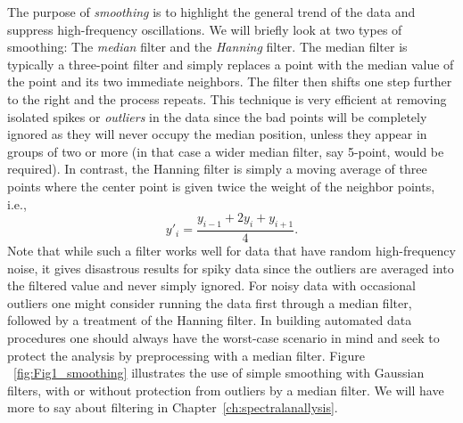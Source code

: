 	The purpose of \emph{smoothing} is to highlight the general trend of the data and suppress
high-frequency oscillations.  We will briefly look at two types of smoothing: The \emph{median} filter and the \emph{Hanning} 
filter. The median filter is typically a three-point filter and simply replaces a point 
with the median value of the point and its two immediate neighbors.  The filter then shifts one step 
further to the right and the process repeats.  This technique is very efficient at removing isolated 
spikes or \emph{outliers} in the data since the bad points will be completely ignored as they will never 
occupy the median position, unless they appear in groups of two or more (in that case a wider 
median filter, say 5-point, would be required).  In contrast, the Hanning filter is simply a moving average of 
three points where the center point is given twice the weight of the neighbor points, i.e.,
\begin{equation}	 
y'_i = \frac{y_{i-1} + 2y_i + y_{i + 1}}{4}.
\end{equation}
Note that while such a filter works well for data that have random high-frequency noise, it gives 
disastrous results for spiky data since the outliers are averaged into the filtered value and never 
simply ignored.  For noisy data with occasional outliers one might consider running the data first 
through a median filter, followed by a treatment of the Hanning filter.  In building automated data
procedures one should always have the worst-case scenario in mind and seek to protect the analysis by
preprocessing with a median filter.  Figure ~\ref{fig:Fig1_smoothing} illustrates the use
of simple smoothing with Gaussian filters, with or without protection from outliers by a median filter.
We will have more to say about filtering in Chapter~\ref{ch:spectralanallysis}.


